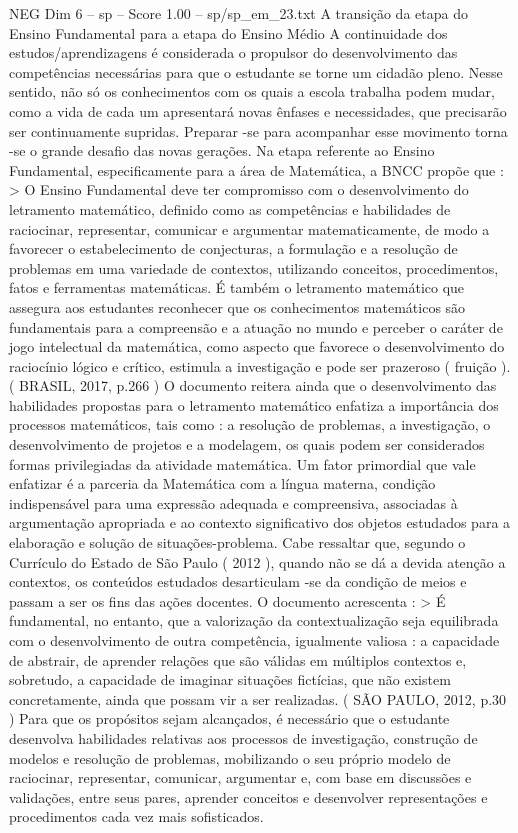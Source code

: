 \begin{textsample}{NEG Dim 6 – sp – Score 1.00 – sp/sp\_em\_23.txt}  \label{ex:f6_neg_208}
A transição da etapa do Ensino Fundamental para a etapa do Ensino Médio A continuidade dos estudos/aprendizagens é considerada o propulsor do desenvolvimento das competências necessárias para que o estudante se torne um cidadão pleno.
Nesse sentido, não só os conhecimentos com os quais a escola trabalha podem mudar, como a vida de cada um apresentará novas ênfases e necessidades, que precisarão ser continuamente supridas.
Preparar -se para acompanhar esse movimento torna -se o grande desafio das novas gerações.
Na etapa referente ao Ensino Fundamental, especificamente para a área de Matemática, a BNCC propõe que : > O Ensino Fundamental deve ter compromisso com o desenvolvimento do letramento matemático, definido como as competências e habilidades de raciocinar, representar, comunicar e argumentar matematicamente, de modo a favorecer o estabelecimento de conjecturas, a formulação e a resolução de problemas em uma variedade de contextos, utilizando conceitos, procedimentos, fatos e ferramentas matemáticas.
É também o letramento matemático que assegura aos estudantes reconhecer que os conhecimentos matemáticos são fundamentais para a compreensão e a atuação no mundo e perceber o caráter de jogo intelectual da matemática, como aspecto que favorece o desenvolvimento do raciocínio lógico e crítico, estimula a investigação e pode ser prazeroso ( fruição ). ( BRASIL, 2017, p.266 ) O documento reitera ainda que o desenvolvimento das habilidades propostas para o letramento matemático enfatiza a importância dos processos matemáticos, tais como : a resolução de problemas, a investigação, o desenvolvimento de projetos e a modelagem, os quais podem ser considerados formas privilegiadas da atividade matemática.
Um fator primordial que vale enfatizar é a parceria da Matemática com a língua materna, condição indispensável para uma expressão adequada e compreensiva, associadas à argumentação apropriada e ao contexto significativo dos objetos estudados para a elaboração e solução de situações-problema.
Cabe ressaltar que, segundo o Currículo do Estado de São Paulo ( 2012 ), quando não se dá a devida atenção a contextos, os conteúdos estudados desarticulam -se da condição de meios e passam a ser os fins das ações docentes.
O documento acrescenta : > É fundamental, no entanto, que a valorização da contextualização seja equilibrada com o desenvolvimento de outra competência, igualmente valiosa : a capacidade de abstrair, de aprender relações que são válidas em múltiplos contextos e, sobretudo, a capacidade de imaginar situações fictícias, que não existem concretamente, ainda que possam vir a ser realizadas. ( SÃO PAULO, 2012, p.30 ) Para que os propósitos sejam alcançados, é necessário que o estudante desenvolva habilidades relativas aos processos de investigação, construção de modelos e resolução de problemas, mobilizando o seu próprio modelo de raciocinar, representar, comunicar, argumentar e, com base em discussões e validações, entre seus pares, aprender conceitos e desenvolver representações e procedimentos cada vez mais sofisticados.

\end{textsample}
